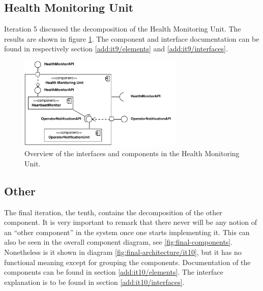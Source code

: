 \subsection{Health Monitoring Unit}

\npar Iteration 5 discussed the decomposition of the Health Monitoring Unit. The
results are shown in figure \ref{fig:final-architecture/it9}. The component and
interface documentation can be found in respectively section
\ref{add:it9/elements} and \ref{add:it9/interfaces}.

\begin{figure}
	\begin{centering}
		\includegraphics[width=0.7\textwidth]{figs/add-it9-interfaces.pdf}
		\caption{Overview of the interfaces and components in the Health Monitoring
		Unit.}
		\label{fig:final-architecture/it9}
	\end{centering}
\end{figure}

\subsection{Other}

\npar The final iteration, the tenth, contains the decomposition of the other
component. It is very important to remark that there never will be any notion of
an ``other component'' in the system once one starts implementing it. This can
also be seen in the overall component diagram, see \ref{fig:final-components}.
Nonetheless is it shown in diagram \ref{fig:final-architecture/it10}, but it has
no functional meaning except for grouping the components. Documentation of the
components can be found in section \ref{add:it10/elements}. The interface
explanation is to be found in section \ref{add:it10/interfaces}.

